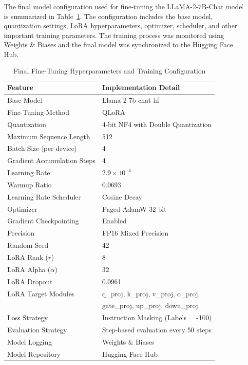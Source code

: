 The final model configuration used for fine-tuning the LLaMA-2-7B-Chat model is summarized in Table~\ref{tab:final_config}. The configuration includes the base model, quantization settings, LoRA hyperparameters, optimizer, scheduler, and other important training parameters. The training process was monitored using Weights \& Biases and the final model was synchronized to the Hugging Face Hub.

\begin{table}[h]
\centering
\caption{Final Fine-Tuning Hyperparameters and Training Configuration}
\begin{tabular}{ll}
\hline
\textbf{Feature} & \textbf{Implementation Detail} \\
\hline
Base Model & Llama-2-7b-chat-hf \\
Fine-Tuning Method & QLoRA \\
Quantization & 4-bit NF4 with Double Quantization \\
Maximum Sequence Length & 512 \\
Batch Size (per device) & 4 \\
Gradient Accumulation Steps & 4 \\
Learning Rate & $2.9 \times 10^{-5}$ \\
Warmup Ratio & 0.0693 \\
Learning Rate Scheduler & Cosine Decay \\
Optimizer & Paged AdamW 32-bit \\
Gradient Checkpointing & Enabled \\
Precision & FP16 Mixed Precision \\
Random Seed & 42 \\
LoRA Rank ($r$) & 8 \\
LoRA Alpha ($\alpha$) & 32 \\
LoRA Dropout & 0.0961 \\
LoRA Target Modules & q\_proj, k\_proj, v\_proj, o\_proj,\\ & gate\_proj, up\_proj, down\_proj \\
Loss Strategy & Instruction Masking (Labels = -100) \\
Evaluation Strategy & Step-based evaluation every 50 steps \\
Model Logging & Weights \& Biases \\
Model Repository & Hugging Face Hub\\
\hline
\end{tabular}

\label{tab:final_config}
\end{table}


